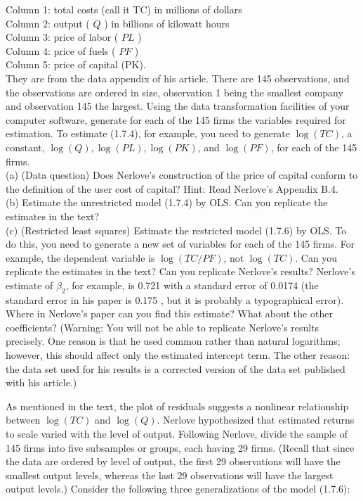 \documentclass[10pt]{article}
\begin{document}
Column 1: total costs (call it TC) in millions of dollars\\
Column 2: output ( $Q$ ) in billions of kilowatt hours\\
Column 3: price of labor ( $P L$ )\\
Column 4: price of fuels ( $P F$ )\\
Column 5: price of capital (PK).\\
They are from the data appendix of his article. There are 145 observations, and the observations are ordered in size, observation 1 being the smallest company and observation 145 the largest. Using the data transformation facilities of your computer software, generate for each of the 145 firms the variables required for estimation. To estimate (1.7.4), for example, you need to generate $\log (T C)$, a constant, $\log (Q), \log (P L), \log (P K)$, and $\log (P F)$, for each of the 145 firms.\\
(a) (Data question) Does Nerlove's construction of the price of capital conform to the definition of the user cost of capital? Hint: Read Nerlove's Appendix B.4.\\
(b) Estimate the unrestricted model (1.7.4) by OLS. Can you replicate the estimates in the text?\\
(c) (Restricted least squares) Estimate the restricted model (1.7.6) by OLS. To do this, you need to generate a new set of variables for each of the 145 firms. For example, the dependent variable is $\log (T C / P F)$, not $\log (T C)$. Can you replicate the estimates in the text? Can you replicate Nerlove's results? Nerlove's estimate of $\beta_{2}$, for example, is 0.721 with a standard error of 0.0174 (the standard error in his paper is 0.175 , but it is probably a typographical error). Where in Nerlove's paper can you find this estimate? What about the other coefficients? (Warning: You will not be able to replicate Nerlove's results precisely. One reason is that he used common rather than natural logarithms; however, this should affect only the estimated intercept term. The other reason: the data set used for his results is a corrected version of the data set published with his article.)

As mentioned in the text, the plot of residuals suggests a nonlinear relationship between $\log (T C)$ and $\log (Q)$. Nerlove hypothesized that estimated returns to scale varied with the level of output. Following Nerlove, divide the sample of 145 firms into five subsamples or groups, each having 29 firms. (Recall that since the data are ordered by level of output, the first 29 observations will have the smallest output levels, whereas the last 29 observations will have the largest output levels.) Consider the following three generalizations of the model (1.7.6):
\end{document}
